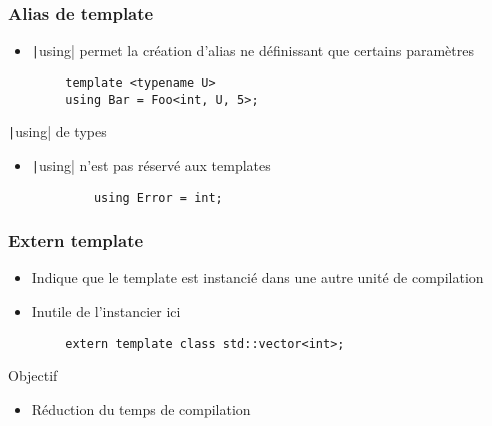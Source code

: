 \documentclass[C++.tex]{subfiles}
\begin{document}
\begin{frame}[fragile]
	\frametitle{Alias de template}
	\begin{itemize}
		\item \texttt|using| permet la création d'alias ne définissant que certains paramètres
	\end{itemize}

	\begin{verbatim}
		template <typename U>
		using Bar = Foo<int, U, 5>;
	\end{verbatim}

	\begin{block}{\texttt|using| de types}
		\begin{itemize}
			\item \texttt|using| n'est pas réservé aux templates
		\end{itemize}

		\begin{verbatim}
			using Error = int;
		\end{verbatim}

	\end{block}
\end{frame}

\begin{frame}[fragile]
	\frametitle{Extern template}
	\begin{itemize}
		\item Indique que le template est instancié dans une autre unité de compilation
		\item Inutile de l'instancier ici
	\end{itemize}

	\begin{verbatim}
		extern template class std::vector<int>;
	\end{verbatim}

	\begin{block}{Objectif}
		\begin{itemize}
			\item Réduction du temps de compilation
		\end{itemize}
	\end{block}

\end{frame}
\end{document}
